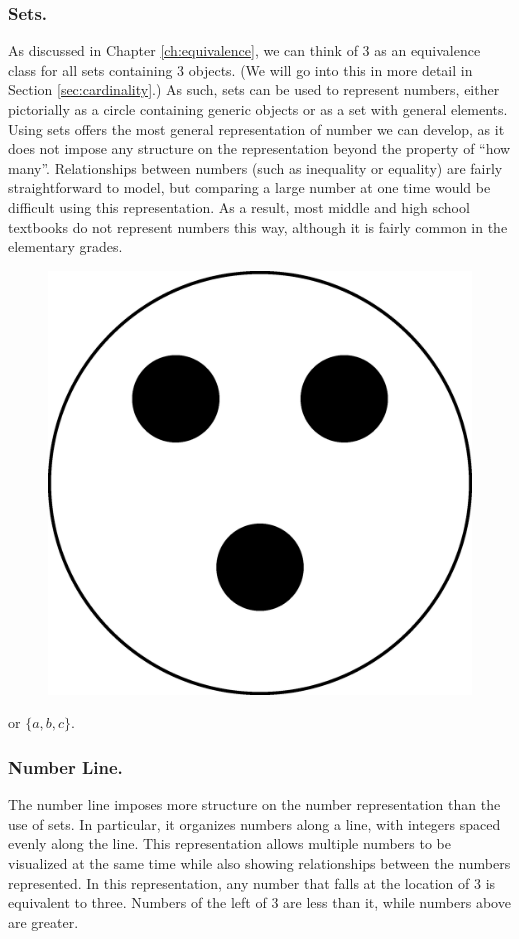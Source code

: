 \documentclass[
]{book}
\theoremstyle{definition}
\theoremstyle{definition}
\theoremstyle{definition}
\theoremstyle{remark}
\begin{document}
\hypertarget{sets.}{%
\subsubsection*{Sets.}\label{sets.}}

As discussed in Chapter \ref{ch:equivalence}, we can think of 3 as an equivalence class for all sets containing 3 objects. (We will go into this in more detail in Section \ref{sec:cardinality}.) As such, sets can be used to represent numbers, either pictorially as a circle containing generic objects or as a set with general elements. Using sets offers the most general representation of number we can develop, as it does not impose any structure on the representation beyond the property of ``how many''. Relationships between numbers (such as inequality or equality) are fairly straightforward to model, but comparing a large number at one time would be difficult using this representation. As a result, most middle and high school textbooks do not represent numbers this way, although it is fairly common in the elementary grades.

\begin{figure}

{\centering \includegraphics[width=0.2\linewidth]{tikz/Set-representations} 

}

\end{figure}

or \(\{a,b,c\}\).

\hypertarget{number-line.}{%
\subsubsection*{Number Line.}\label{number-line.}}

The number line imposes more structure on the number representation than the use of sets. In particular, it organizes numbers along a line, with integers spaced evenly along the line. This representation allows multiple numbers to be visualized at the same time while also showing relationships between the numbers represented. In this representation, any number that falls at the location of 3 is equivalent to three. Numbers of the left of 3 are less than it, while numbers above are greater.
\end{document}
